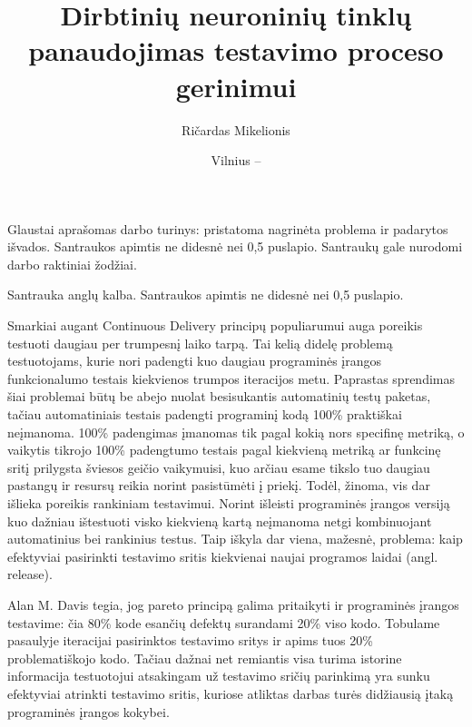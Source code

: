 \documentclass{VUMIFPSbakalaurinis}
\title{Dirbtinių neuroninių tinklų panaudojimas testavimo proceso gerinimui}
\author{Ričardas Mikelionis}
\date{Vilnius – \the\year}
\begin{document}
\maketitle


Glaustai aprašomas darbo turinys: pristatoma nagrinėta problema ir padarytos
išvados. Santraukos apimtis ne didesnė nei 0,5 puslapio. Santraukų gale
nurodomi darbo raktiniai žodžiai. 

Santrauka anglų kalba. Santraukos apimtis ne didesnė nei 0,5 puslapio.

\tableofcontents

Smarkiai augant Continuous Delivery principų populiarumui auga poreikis testuoti daugiau per trumpesnį laiko tarpą. Tai kelią didelę problemą testuotojams, kurie nori padengti kuo daugiau programinės įrangos funkcionalumo testais kiekvienos trumpos iteracijos metu. Paprastas sprendimas šiai problemai būtų be abejo nuolat besisukantis automatinių testų paketas, tačiau automatiniais testais padengti programinį kodą 100\% praktiškai neįmanoma. 100\% padengimas įmanomas tik pagal kokią nors specifinę metriką, o vaikytis tikrojo 100\% padengtumo testais pagal kiekvieną metriką ar funkcinę sritį prilygsta šviesos geičio vaikymuisi, kuo arčiau esame tikslo tuo daugiau pastangų ir resursų reikia norint pasistūmėti į priekį. Todėl, žinoma, vis dar išlieka poreikis rankiniam testavimui. Norint išleisti programinės įrangos versiją kuo dažniau ištestuoti visko kiekvieną kartą neįmanoma netgi kombinuojant automatinius bei rankinius testus. Taip iškyla dar viena, mažesnė, problema: kaip efektyviai pasirinkti testavimo sritis kiekvienai naujai programos laidai (angl. release). 

Alan M. Davis \cite{Davis:1995:PSD:203406} tegia, jog pareto principą galima pritaikyti ir programinės įrangos testavime: čia 80\% kode esančių defektų surandami 20\% viso kodo. Tobulame pasaulyje iteracijai pasirinktos testavimo sritys ir apims tuos 20\% problematiškojo kodo. Tačiau dažnai net remiantis visa turima istorine informacija testuotojui atsakingam už testavimo sričių parinkimą yra sunku efektyviai atrinkti testavimo sritis, kuriose atliktas darbas turės didžiausią įtaką programinės įrangos kokybei.
\end{document}
